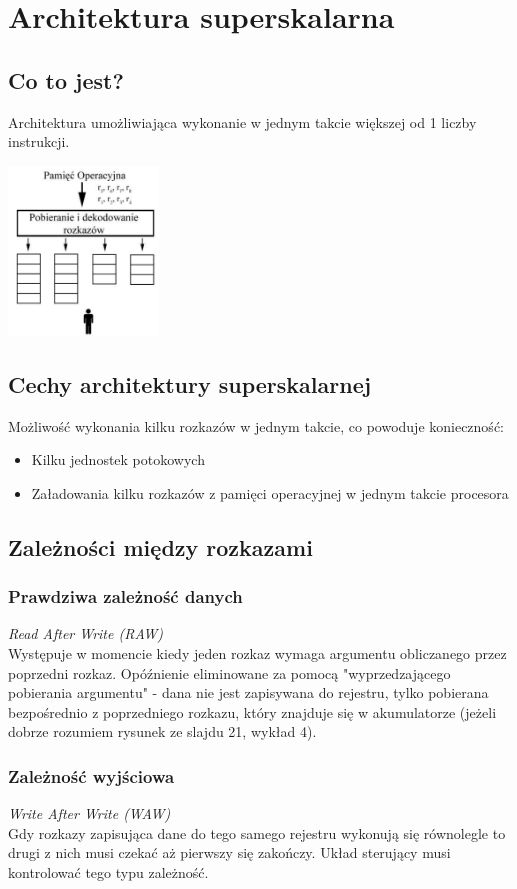 \documentclass[a4paper,twoside]{article}
\begin{document}
\section{Architektura superskalarna}
\subsection{Co to jest?}
Architektura umożliwiająca wykonanie w jednym takcie większej od 1 liczby instrukcji.
\begin{center}
	\includegraphics[width=0.3\textwidth]{./images/superskalarna01}
\end{center}
\subsection{Cechy architektury superskalarnej}
Możliwość wykonania kilku rozkazów w jednym takcie, co powoduje konieczność:
\begin{itemize}
	\item Kilku jednostek potokowych
	\item Załadowania kilku rozkazów z pamięci operacyjnej w jednym takcie procesora
\end{itemize}
\subsection{Zależności między rozkazami}
\subsubsection{Prawdziwa zależność danych} \label{subsubsec:RAW}
\emph{Read After Write (RAW)}\\
Występuje w momencie kiedy jeden rozkaz wymaga argumentu obliczanego przez poprzedni rozkaz. Opóźnienie eliminowane za pomocą "wyprzedzającego pobierania argumentu" - dana nie jest zapisywana do rejestru, tylko pobierana bezpośrednio z poprzedniego rozkazu, który znajduje się w akumulatorze (jeżeli dobrze rozumiem rysunek ze slajdu 21, wykład 4).
\subsubsection{Zależność wyjściowa}
\emph{Write After Write (WAW)}\\
Gdy rozkazy zapisująca dane do tego samego rejestru wykonują się równolegle to drugi z nich musi czekać aż pierwszy się zakończy. Układ sterujący musi kontrolować tego typu zależność.
\end{document}
